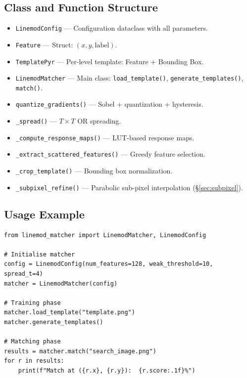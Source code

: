 \documentclass[12pt,a4paper]{article}
\begin{document}
\subsection{Class and Function Structure}
\begin{itemize}
  \item \texttt{LinemodConfig} --- Configuration dataclass with all parameters.
  \item \texttt{Feature} --- Struct: $(x, y, \text{label})$.
  \item \texttt{TemplatePyr} --- Per-level template: Feature $+$ Bounding Box.
  \item \texttt{LinemodMatcher} --- Main class:
        \texttt{load\_template()}, \texttt{generate\_templates()}, \texttt{match()}.
  \item \texttt{quantize\_gradients()} --- Sobel $+$ quantization $+$ hysteresis.
  \item \texttt{\_spread()} --- $T \times T$ OR spreading.
  \item \texttt{\_compute\_response\_maps()} --- LUT-based response maps.
  \item \texttt{\_extract\_scattered\_features()} --- Greedy feature selection.
  \item \texttt{\_crop\_template()} --- Bounding box normalization.
  \item \texttt{\_subpixel\_refine()} --- Parabolic sub-pixel interpolation (§\ref{sec:subpixel}).
\end{itemize}

\subsection{Usage Example}

\begin{lstlisting}[style=python, caption={Basic usage of the LINE-2D matcher},
                   label={lst:usage}]
from linemod_matcher import LinemodMatcher, LinemodConfig

# Initialise matcher
config = LinemodConfig(num_features=128, weak_threshold=10, spread_t=4)
matcher = LinemodMatcher(config)

# Training phase
matcher.load_template("template.png")
matcher.generate_templates()

# Matching phase
results = matcher.match("search_image.png")
for r in results:
    print(f"Match at ({r.x}, {r.y}):  {r.score:.1f}%")
\end{lstlisting}

\end{document}
